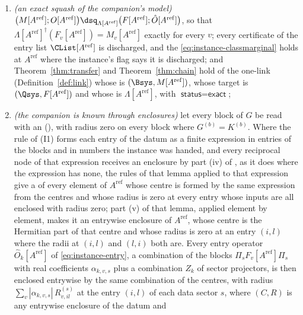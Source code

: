 \begin{corollary}
\begin{enumerate}[label=(\roman*),leftmargin=3.0em]
  carries $A^{\mathrm{ref}}$. Where $G=K$, $A^{\mathrm{ref}}=A$: the
  reference companion is $\mathcal{J}$ at its handed datum;
\item \emph{(an exact squash of the companion's model)}
  $\big(M[A^{\mathrm{ref}}];O[A^{\mathrm{ref}}]\big)\dsq_{\Lambda[A^{\mathrm{ref}}]}
  \big(F[A^{\mathrm{ref}}];\hat O[A^{\mathrm{ref}}]\big)$, so that
  $\Lambda[A^{\mathrm{ref}}]^{\dagger}(F_v[A^{\mathrm{ref}}])=M_v[A^{\mathrm{ref}}]$
  exactly for every $v$; every certificate of the entry list
  $\CList[A^{\mathrm{ref}}]$ is discharged, and the 
  \eqref{eq:instance-classmarginal} holds at $A^{\mathrm{ref}}$ where the
  instance's flag says it is discharged; and Theorem~\ref{thm:transfer} and
  Theorem~\ref{thm:chain} hold of the one-link 
  (Definition~\ref{def:link}) whose  is
  $(\Bsys,M[A^{\mathrm{ref}}])$, whose target is
  $(\Qsys,F[A^{\mathrm{ref}}])$ and whose  is
  $\Lambda[A^{\mathrm{ref}}]$, with $\textsf{status}=\textsf{exact}$;
\item \emph{(the companion is known through enclosures)} let every block of
  $G$ be read with an 
  (), with radius zero on every block
  where $G^{(b)}=K^{(b)}$. Where the rule of (I1) forms each entry of the
  datum as a finite expression in entries of the blocks and in numbers the
  instance was handed, and every reciprocal node of that expression receives
  an enclosure by part (iv) of , as
  it does where the expression has none, the rules of that lemma applied to
  that expression give a  of every element of
  $A^{\mathrm{ref}}$ whose centre is formed by the same expression from the
  centres and whose radius is zero at every entry whose inputs are all
  enclosed with radius zero; part (v) of that lemma, applied element by
  element, makes it an entrywise enclosure of $A^{\mathrm{ref}}$, whose
  centre is the Hermitian part of that centre and whose radius is zero at an
  entry $(i,l)$ where the radii at $(i,l)$ and $(l,i)$ both are. Every entry operator
  $\hat O_k[A^{\mathrm{ref}}]$ of \eqref{eq:instance-entry}, a combination
  of the blocks $\Pi_sF_v[A^{\mathrm{ref}}]\Pi_s$ with real coefficients
  $\alpha_{k,v,s}$ plus a combination $Z_k$ of sector projectors, is then
  enclosed entrywise by the same combination of the centres, with radius
  $\sum_{v}|\alpha_{k,v,s}|\,R^{(s)}_{v,il}$ at the entry $(i,l)$ of each
  data sector $s$, where $(C,R)$ is any entrywise enclosure of the datum and

\end{enumerate}
\end{corollary}
